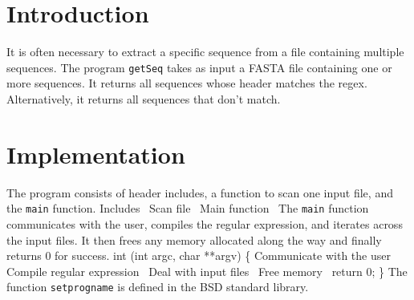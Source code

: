 \nwfilename{}\nwenddocs{}\nwdocspar%
\section{Introduction}
It is often necessary to extract a specific sequence from a file
containing multiple sequences. The program \texttt{getSeq} takes as
input a FASTA file containing one or more sequences. It returns all sequences whose header
matches the regex. Alternatively, it returns all sequences that don't
match.
\section{Implementation}
The program consists of header includes, a function to scan one input
file, and the \texttt{main} function.
\nwenddocs{}\endmoddef\nwstartdeflinemarkup\nwenddeflinemarkup
\LA{}Includes~{\nwtagstyle{}}\RA{}
\LA{}Scan file~{\nwtagstyle{}}\RA{}
\LA{}Main function~{\nwtagstyle{}}\RA{}
\nwendcode{}\nwdocspar
The \texttt{main} function communicates with the user, compiles the
regular expression, and iterates across the input files. It then frees
any memory allocated along the way and finally returns 0 for success.
\nwenddocs{}\endmoddef\nwstartdeflinemarkup{}\nwenddeflinemarkup
int (int argc, char **argv) \{
  \LA{}Communicate with the user~{\nwtagstyle{}}\RA{}
  \LA{}Compile regular expression~{\nwtagstyle{}}\RA{}
  \LA{}Deal with input files~{\nwtagstyle{}}\RA{}
  \LA{}Free memory~{\nwtagstyle{}}\RA{}
  return 0;
\}
\nwendcode{}\nwdocspar
The function \texttt{setprogname} is defined in the BSD standard
library.
\nwenddocs{}\endmoddef\nwstartdeflinemarkup{}\nwenddeflinemarkup
